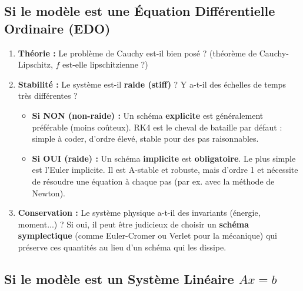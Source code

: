 \subsection{Si le modèle est une Équation Différentielle Ordinaire (EDO)}

\begin{proposition}[Checklist pour EDO $y'=f(t,y)$]
    \begin{enumerate}
        \item \textbf{Théorie :} Le problème de Cauchy est-il bien posé ? (théorème de Cauchy-Lipschitz, $f$ est-elle lipschitzienne ?)
        \item \textbf{Stabilité :} Le système est-il \textbf{raide (stiff)} ? Y a-t-il des échelles de temps très différentes ?
            \begin{itemize}
                \item \textbf{Si NON (non-raide) :} Un schéma \textbf{explicite} est généralement préférable (moins coûteux). RK4 est le cheval de bataille par défaut : simple à coder, d'ordre élevé, stable pour des pas raisonnables.
                \item \textbf{Si OUI (raide) :} Un schéma \textbf{implicite} est \textbf{obligatoire}. Le plus simple est l'Euler implicite. Il est A-stable et robuste, mais d'ordre 1 et nécessite de résoudre une équation à chaque pas (par ex. avec la méthode de Newton).
            \end{itemize}
        \item \textbf{Conservation :} Le système physique a-t-il des invariants (énergie, moment...) ? Si oui, il peut être judicieux de choisir un \textbf{schéma symplectique} (comme Euler-Cromer ou Verlet pour la mécanique) qui préserve ces quantités au lieu d'un schéma qui les dissipe.
    \end{enumerate}
\end{proposition}

\subsection{Si le modèle est un Système Linéaire $Ax=b$}

